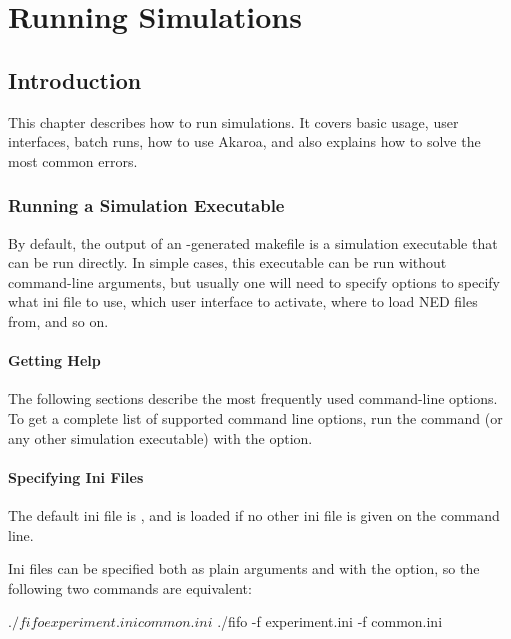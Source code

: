 \chapter{Running Simulations}
\label{cha:run-sim}

\section{Introduction}

This chapter describes how to run simulations. It covers basic usage,
user interfaces, batch runs, how to use Akaroa, and also explains
how to solve the most common errors.

\subsection{Running a Simulation Executable}
\label{sec:ch-run-sim:running}

By default, the output of an -generated makefile is
a simulation executable that can be run directly. In simple cases,
this executable can be run without command-line arguments, but usually
one will need to specify options to specify what ini file to use,
which user interface to activate, where to load NED files from, and so on.

\subsubsection{Getting Help}

The following sections describe the most frequently used command-line
options. To get a complete list of supported command line options, run
the  command (or any other simulation executable) with
the  option.


\subsubsection{Specifying Ini Files}

The default ini file is , and is
loaded if no other ini file is given on the command line.

Ini files can be specified both as plain arguments and with the 
option, so the following two commands are equivalent:

\begin{commandline}
$ ./fifo experiment.ini common.ini
$ ./fifo -f experiment.ini -f common.ini
\end{commandline}

